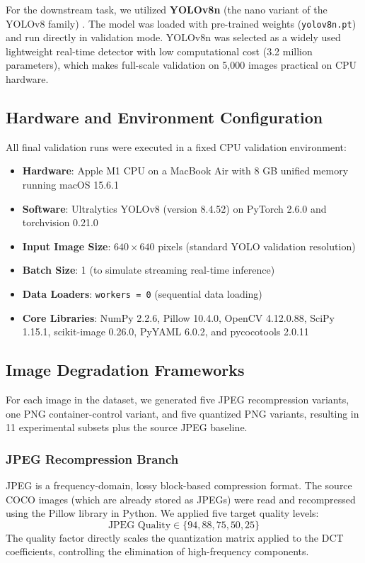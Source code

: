 \documentclass[12pt, a4paper]{article}
\begin{document}
For the downstream task, we utilized \textbf{YOLOv8n} (the nano variant of the YOLOv8 family) \cite{jocher2023}. The model was loaded with pre-trained weights (\texttt{yolov8n.pt}) and run directly in validation mode. YOLOv8n was selected as a widely used lightweight real-time detector with low computational cost (3.2 million parameters), which makes full-scale validation on 5,000 images practical on CPU hardware.

\subsection{Hardware and Environment Configuration}
All final validation runs were executed in a fixed CPU validation environment:
\begin{itemize}
    \item \textbf{Hardware}: Apple M1 CPU on a MacBook Air with 8 GB unified memory running macOS 15.6.1
    \item \textbf{Software}: Ultralytics YOLOv8 (version 8.4.52) on PyTorch 2.6.0 and torchvision 0.21.0
    \item \textbf{Input Image Size}: $640\times640$ pixels (standard YOLO validation resolution)
    \item \textbf{Batch Size}: 1 (to simulate streaming real-time inference)
    \item \textbf{Data Loaders}: \texttt{workers = 0} (sequential data loading)
    \item \textbf{Core Libraries}: NumPy 2.2.6, Pillow 10.4.0, OpenCV 4.12.0.88, SciPy 1.15.1, scikit-image 0.26.0, PyYAML 6.0.2, and pycocotools 2.0.11
\end{itemize}

\subsection{Image Degradation Frameworks}
For each image in the dataset, we generated five JPEG recompression variants, one PNG container-control variant, and five quantized PNG variants, resulting in 11 experimental subsets plus the source JPEG baseline.

\subsubsection{JPEG Recompression Branch}
JPEG is a frequency-domain, lossy block-based compression format. The source COCO images (which are already stored as JPEGs) were read and recompressed using the Pillow library in Python. We applied five target quality levels:
$$\text{JPEG Quality} \in \{94, 88, 75, 50, 25\}$$
The quality factor directly scales the quantization matrix applied to the DCT coefficients, controlling the elimination of high-frequency components.
\end{document}
